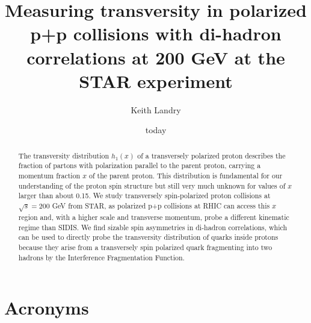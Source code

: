 \documentclass[abstract = on,listof=totoc, bibliography=totoc]{scrreprt}
\begin{document}
\title{Measuring transversity in polarized p+p collisions with di-hadron correlations at  200 GeV at the STAR experiment}
\author{Keith Landry}
\date{today}
\maketitle

\begin{abstract}
The transversity distribution $h_1(x)$ of a transversely polarized proton describes the fraction of partons with polarization parallel to the parent proton, carrying a momentum fraction $x$ of the parent proton. This distribution is fundamental for our understanding of the proton spin structure but still very much unknown for values of $x$ larger than about 0.15. %
We study transversely spin-polarized proton collisions at $\sqrt{s}=200$ GeV from STAR, as polarized p+p collisions at RHIC can access this $x$ region and, with a higher scale and transverse momentum,  probe a different kinematic regime than SIDIS. We find sizable spin asymmetries in di-hadron correlations, which can be used to directly probe the transversity distribution of quarks inside protons because they arise from a transversely spin polarized quark fragmenting into two hadrons by the Interference Fragmentation Function. 
\end{abstract}

\tableofcontents
\listoffigures
\listoftables


\chapter*{Acronyms}
 
\end{document}
